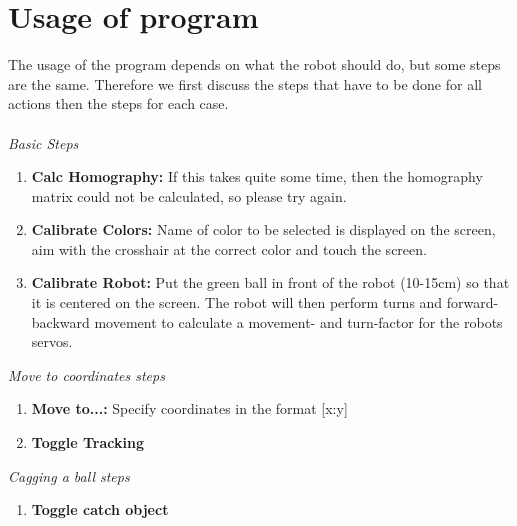 \documentclass[703031]{iisreport}
\begin{document}
\section{Usage of program}
The usage of the program depends on what the robot should do, but some steps are the same. Therefore we first discuss the steps that have to be done for all actions then the steps for each case.\\\\
\emph{Basic Steps}
	\begin{enumerate}
		\item \textbf{Calc Homography:} If this takes quite some time, then the homography matrix could not be calculated, so please try again.
		\item \textbf{Calibrate Colors:} Name of color to be selected is displayed on the screen, aim with the crosshair at the correct color and touch the screen.
		\item \textbf{Calibrate Robot:} Put the green ball in front of the robot (10-15cm) so that it is centered on the screen. The robot will then perform turns and forward-backward movement to calculate a movement- and turn-factor for the robots servos.\\
	\end{enumerate}
\emph{Move to coordinates steps}
	\begin{enumerate}
		\item \textbf{Move to...:} Specify coordinates in the format [x:y]
		\item \textbf{Toggle Tracking}\\
	\end{enumerate}
\emph{Cagging a ball steps}
	\begin{enumerate}
		\item \textbf{Toggle catch object}
	\end{enumerate}


\end{document}
